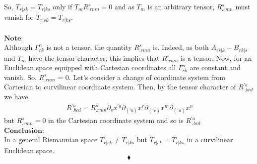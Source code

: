 So, $T_{r|sk} =  T_{r|ks}$ only if $T_m R^s_{.rmn} = 0$ and as $T_m$ is an arbitrary tensor, $R^s_{.rmn}$ must vanish for $T_{r|sk} =  T_{r|ks}$.\\\\
$\textbf{Note:}$\\
Although $\Gamma^n_{rk}$ is not a tensor, the quantity $R^s_{.rmn}$ is. Indeed, as both $A_{rs|k} - B_{rk|s}$ and $ T_m$ have the tensor character, this implies that $R^s_{.rmn}$ is a tensor.
Now, for an Euclidean space equipped with Cartesian coordinates all $\Gamma^n_{rk} $ are constant and vanish. So, $R^s_{.rmn}$ = 0. Let's consider a change of coordinate system from Cartesian to curvilinear coordinate system. Then, by the tensor character of $R^{'a}_{\ .bcd}$ we have,
\begin{align}
\ R^{'a}_{\ .bcd} = R^s_{.rmn}\partial_s x^{'a} \partial_{('b)} x^{r} \partial_{('c)} x^{m} \partial_{('d)} x^{n}
\end{align}
but $R^s_{.rmn} =0$ in the Cartesian coordinate system and so is $R^{'a}_{\ .bcd}$\\
$\textbf{Conclusion:}$\\
In a general Riemannian space $T_{r|sk} \neq  T_{r|ks}$ but $T_{r|sk} =  T_{r|ks}$ in a curvilinear Euclidean space.
$$\blacklozenge$$
\newpage


